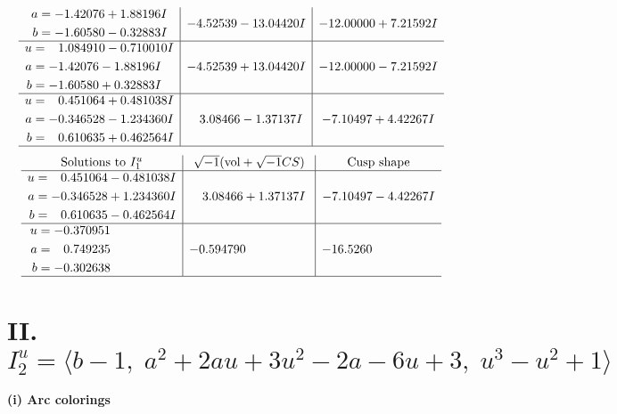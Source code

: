 \documentclass[1p]{elsarticle_modified}
\theoremstyle{definition}
\newcommand{\I}{\sqrt{-1}}
\begin{document}
$$\begin{array}{c|c|c}
\begin{aligned}
a &= -1.42076 + 1.88196 I \\
b &= -1.60580 - 0.32883 I\end{aligned}
 & -4.52539 - 13.04420 I & -12.00000 + 7.21592 I \\ \hline\begin{aligned}
u &= \phantom{-}1.084910 - 0.710010 I \\
a &= -1.42076 - 1.88196 I \\
b &= -1.60580 + 0.32883 I\end{aligned}
 & -4.52539 + 13.04420 I & -12.00000 - 7.21592 I \\ \hline\begin{aligned}
u &= \phantom{-}0.451064 + 0.481038 I \\
a &= -0.346528 - 1.234360 I \\
b &= \phantom{-}0.610635 + 0.462564 I\end{aligned}
 & \phantom{-}3.08466 - 1.37137 I & -7.10497 + 4.42267 I\\
 \hline 
 \end{array}$$\newpage$$\begin{array}{c|c|c}  
\text{Solutions to }I^u_{1}& \I (\text{vol} + \sqrt{-1}CS) & \text{Cusp shape}\\
 \hline 
\begin{aligned}
u &= \phantom{-}0.451064 - 0.481038 I \\
a &= -0.346528 + 1.234360 I \\
b &= \phantom{-}0.610635 - 0.462564 I\end{aligned}
 & \phantom{-}3.08466 + 1.37137 I & -7.10497 - 4.42267 I \\ \hline\begin{aligned}
u &= -0.370951\phantom{ +0.000000I} \\
a &= \phantom{-}0.749235\phantom{ +0.000000I} \\
b &= -0.302638\phantom{ +0.000000I}\end{aligned}
 & -0.594790\phantom{ +0.000000I} & -16.5260\phantom{ +0.000000I}\\
 \hline 
 \end{array}$$\newpage\newpage\renewcommand{\arraystretch}{1}
\centering \section*{II. $I^u_{2}= \langle b-1,\;a^2+2 a u+3 u^2-2 a-6 u+3,\;u^3- u^2+1 \rangle$}
\flushleft \textbf{(i) Arc colorings}\\
\end{document}
